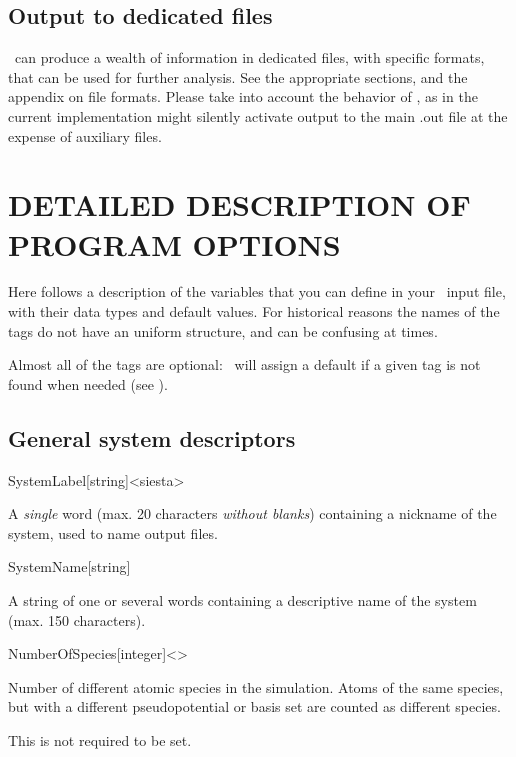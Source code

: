 \subsection{Output to dedicated files}%

\siesta\ can produce a wealth of information in dedicated files,
with specific formats, that can be used for further analysis. See the
appropriate sections, and the appendix on file formats.
Please take into account the behavior of
, as in the current implementation might silently
activate output to the main .out file at the expense of auxiliary
files.


\section{DETAILED DESCRIPTION OF PROGRAM OPTIONS}


Here follows a description of the variables that you can define in
your \siesta\ input file, with their data types and default
values. For historical reasons the names of the tags do not have an
uniform structure, and can be confusing at times.

Almost all of the tags are optional: \siesta\ will assign a
default if a given tag is not found when needed (see ).


\subsection{General system descriptors}

\begin{fdfentry}{SystemLabel}[string]<siesta>
  
  A \emph{single} word (max. 20 characters \emph{without blanks})
  containing a nickname of the system, used to name output files.

\end{fdfentry}


\begin{fdfentry}{SystemName}[string]

  A string of one or several words containing a descriptive name of
  the system (max. 150 characters).
  
\end{fdfentry}


\begin{fdfentry}{NumberOfSpecies}[integer]<>

  Number of different atomic species in the simulation.  Atoms of the
  same species, but with a different pseudopotential or basis set are
  counted as different species.

  \note This is not required to be set.
  
\end{fdfentry}

